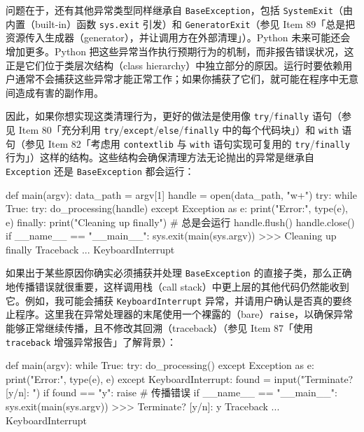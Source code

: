 问题在于，还有其他异常类型同样继承自 \texttt{BaseException}，包括 \texttt{SystemExit}（由内置（built-in）函数 \texttt{sys.exit} 引发）和 \texttt{GeneratorExit}（参见 Item 89「总是把资源传入生成器（generator），并让调用方在外部清理」）。Python 未来可能还会增加更多。Python 把这些异常当作执行预期行为的机制，而非报告错误状况，这正是它们位于类层次结构（class hierarchy）中独立部分的原因。运行时要依赖用户通常不会捕获这些异常才能正常工作；如果你捕获了它们，就可能在程序中无意间造成有害的副作用。

因此，如果你想实现这类清理行为，更好的做法是使用像 \texttt{try}/\texttt{finally} 语句（参见 Item 80「充分利用 \texttt{try}/\texttt{except}/\texttt{else}/\texttt{finally} 中的每个代码块」）和 \texttt{with} 语句（参见 Item 82「考虑用 \texttt{contextlib} 与 \texttt{with} 语句实现可复用的 \texttt{try}/\texttt{finally} 行为」）这样的结构。这些结构会确保清理方法无论抛出的异常是继承自 \texttt{Exception} 还是 \texttt{BaseException} 都会运行：

\begin{codebox}[python]
def main(argv):
    data_path = argv[1]
    handle = open(data_path, "w+")
    try:
        while True:
            try:
                do_processing(handle)
            except Exception as e:
                print("Error:", type(e), e)
    finally:
        print("Cleaning up finally")  # 总是会运行
        handle.flush()
        handle.close()
if __name__ == "__main__":
    sys.exit(main(sys.argv))
>>>
Cleaning up finally
Traceback ...
KeyboardInterrupt
\end{codebox}

如果出于某些原因你确实必须捕获并处理 \texttt{BaseException} 的直接子类，那么正确地传播错误就很重要，这样调用栈（call stack）中更上层的其他代码仍然能收到它。例如，我可能会捕获 \texttt{KeyboardInterrupt} 异常，并请用户确认是否真的要终止程序。这里我在异常处理器的末尾使用一个裸露的（bare）\texttt{raise}，以确保异常能够正常继续传播，且不修改其回溯（traceback）（参见 Item 87「使用 \texttt{traceback} 增强异常报告」了解背景）：

\begin{codebox}[python]
def main(argv):
    while True:
        try:
            do_processing()
        except Exception as e:
            print("Error:", type(e), e)
        except KeyboardInterrupt:
            found = input("Terminate? [y/n]: ")
            if found == "y":
                raise  # 传播错误
if __name__ == "__main__":
    sys.exit(main(sys.argv))
>>>
Terminate? [y/n]: y
Traceback ...
KeyboardInterrupt
\end{codebox}

